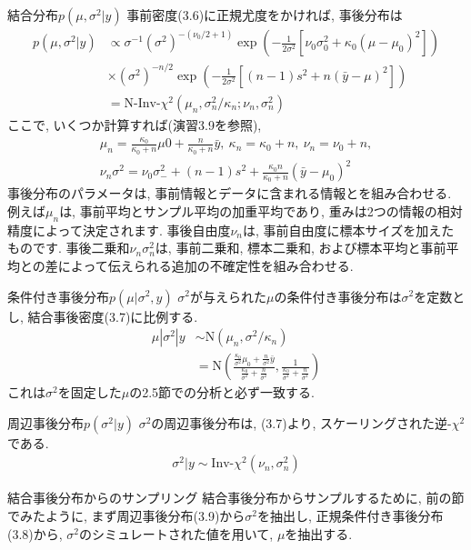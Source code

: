 \documentclass[10pt,dvipdfmx,a4]{beamer}
\newcommand{\eq}[1]{\begin{align}#1\end{align}}
\newcommand{\eqn}[1]{\begin{align*}#1\end{align*}}
\begin{document}

\begin{frame}{結合分布$p(\mu,\sigma^2|y)$}
事前密度(3.6)に正規尤度をかければ, 事後分布は
\eq{p(\mu,\sigma^2|y)&\propto\sigma^{-1}(\sigma^2)^{-(\nu_0/2+1)}\exp \left( -\frac{1}{2\sigma^2}[\nu_0\sigma_0^2+\kappa_0(\mu-\mu_0)^2]\right)\nonumber\\
&\times (\sigma^2)^{-n/2}\exp \left( -\frac{1}{2\sigma^2}[(n-1)s^2+n(\bar{y}-\mu)^2]\right)\nonumber\\
&=\text{N-Inv-}\chi^2(\mu_n,\sigma^2_n/\kappa_n;\nu_n,\sigma_n^2)}
ここで, いくつか計算すれば(演習3.9を参照), 
\eqn{\mu_n=\frac{\kappa_0}{\kappa_0+n}\mu0+\frac{n}{\kappa_0+n}\bar{y},\ \kappa_n=\kappa_0+n,\ \nu_n=\nu_0+n,\\\nu_n\sigma^2=\nu_0\sigma^2_-+(n-1)s^2+\frac{\kappa_0n}{\kappa_0+n}(\bar{y}-\mu_0)^2}
事後分布のパラメータは, 事前情報とデータに含まれる情報とを組み合わせる.
例えば$\mu_n$は, 事前平均とサンプル平均の加重平均であり, 重みは2つの情報の相対精度によって決定されます.
事後自由度$\nu_n$は, 事前自由度に標本サイズを加えたものです.
事後二乗和$\nu_n\sigma^2_n$は, 事前二乗和, 標本二乗和, および標本平均と事前平均との差によって伝えられる追加の不確定性を組み合わせる.
\end{frame}


\begin{frame}{条件付き事後分布$p(\mu|\sigma^2,y)$}
$\sigma^2$が与えられた$\mu$の条件付き事後分布は$\sigma^2$を定数とし, 結合事後密度(3.7)に比例する.
\eq{\mu|\sigma^2|y&\sim\text{N}(\mu_n,\sigma^2/\kappa_n)\nonumber\\
&=\text{N}\left(\frac{\tfrac{\kappa_0}{\sigma^2}\mu_0+\tfrac{n}{\sigma^2}\bar{y}}{\frac{\kappa_0}{\sigma^2}+\tfrac{n}{\sigma^2}}, \frac{1}{\frac{\kappa_0}{\sigma^2}+\tfrac{n}{\sigma^2}}\right)}
これは$\sigma^2$を固定した$\mu$の2.5節での分析と必ず一致する.
\end{frame}


\begin{frame}{周辺事後分布$p(\sigma^2|y)$}
$\sigma^2$の周辺事後分布は, (3.7)より, スケーリングされた逆-$\chi^2$である.
\eq{\sigma^2|y\sim\text{Inv-}\chi^2(\nu_n,\sigma_n^2)}
\end{frame}


\begin{frame}{結合事後分布からのサンプリング}
結合事後分布からサンプルするために, 前の節でみたように, まず周辺事後分布(3.9)から$\sigma^2$を抽出し, 正規条件付き事後分布(3.8)から, $\sigma^2$のシミュレートされた値を用いて, $\mu$を抽出する.
\end{frame}
\end{document}
